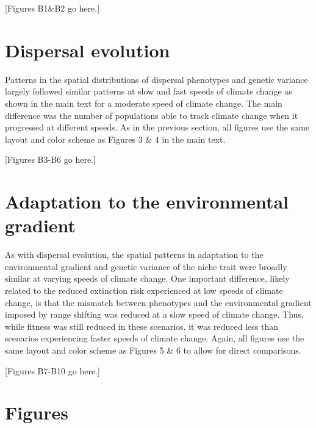 \documentclass[11pt]{article}
\begin{document}
[Figures B1\&B2 go here.]

\section*{Dispersal evolution}
Patterns in the spatial distributions of dispersal phenotypes and genetic variance largely followed similar patterns at slow and fast speeds of climate change as shown in the main text for a moderate speed of climate change. The main difference was the number of populations able to track climate change when it progressed at different speeds. As in the previous section, all figures use the same layout and color scheme as Figures 3 \& 4 in the main text.

[Figures B3-B6 go here.]

\section*{Adaptation to the environmental gradient}
As with dispersal evolution, the spatial patterns in adaptation to the environmental gradient and genetic variance of the niche trait were broadly similar at varying speeds of climate change. One important difference, likely related to the reduced extinction risk experienced at low speeds of climate change, is that the mismatch between phenotypes and the environmental gradient imposed by range shifting was reduced at a slow speed of climate change. Thus, while fitness was still reduced in these scenarios, it was reduced less than scenarios experiencing faster speeds of climate change. Again, all figures use the same layout and color scheme as Figures 5 \& 6 to allow for direct comparisons.

[Figures B7-B10 go here.]

\newpage{}





\newpage{}

\section*{Figures}
\end{document}
